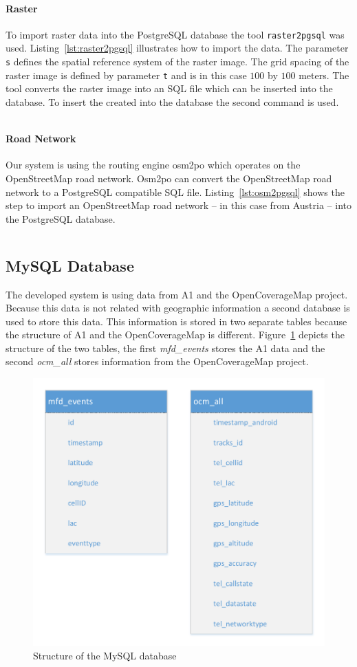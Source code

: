 \documentclass[master,english]{hgbthesis}
\begin{document}
\paragraph{Raster}
To import raster data into the PostgreSQL database the tool \verb|raster2pgsql| was used. Listing~\ref{lst:raster2pgsql} illustrates how to import the data. The parameter \verb|s| defines the spatial reference system of the raster image. The grid spacing of the raster image is defined by parameter \verb|t| and is in this case $100$ by $100$ meters. The tool converts the raster image into an SQL file which can be inserted into the database. To insert the created into the database the second command is used.
\begin{lstlisting}[style=BashInputStyle,caption={Import raster data into PostgreSQL database},label={lst:raster2pgsql}]
\end{lstlisting}
\paragraph{Road Network}
Our system is using the routing engine osm2po which operates on the OpenStreetMap road network. Osm2po can convert the OpenStreetMap road network to a PostgreSQL compatible SQL file. Listing~\ref{lst:osm2pgsql} shows the step to import an OpenStreetMap road network -- in this case from Austria -- into the PostgreSQL  database.
\begin{lstlisting}[style=BashInputStyle,caption={Import OpenStreetmap data into PostgreSQL database},label={lst:osm2pgsql}]
\end{lstlisting}
\subsection{MySQL Database}
The developed system is using data from A1 and the OpenCoverageMap project. Because this data is not related with geographic information a second database is used to store this data. This information is stored in two separate tables because the structure of A1 and the OpenCoverageMap is different. Figure~\ref{fig:mysql_structure} depicts the structure of the two tables, the first \emph{mfd_events} stores the A1 data and the second \emph{ocm_all} stores information from the OpenCoverageMap project.
\begin{figure}
\centering
\includegraphics[width=0.7\linewidth]{./images/mysql_structure}
\caption{Structure of the MySQL database}
\label{fig:mysql_structure}
\end{figure}
\end{document}
